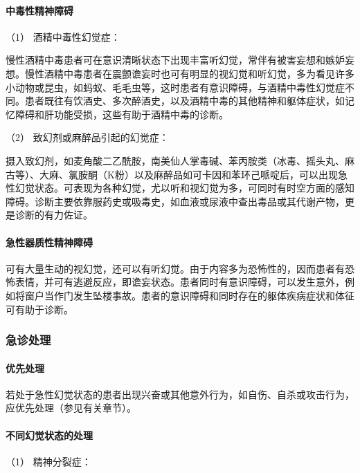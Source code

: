 \paragraph{中毒性精神障碍}

\hypertarget{text00048.htmlux5cux23CHP1-18-6-2-5-1}{}
（1） 酒精中毒性幻觉症：

慢性酒精中毒患者可在意识清晰状态下出现丰富听幻觉，常伴有被害妄想和嫉妒妄想。慢性酒精中毒患者在震颤谵妄时也可有明显的视幻觉和听幻觉，多为看见许多小动物或昆虫，如蚂蚁、毛毛虫等，这时患者有意识障碍，与酒精中毒性幻觉症不同。患者既往有饮酒史、多次醉酒史，以及酒精中毒的其他精神和躯体症状，如记忆障碍和肝功能受损，这些有助于酒精中毒的诊断。

\hypertarget{text00048.htmlux5cux23CHP1-18-6-2-5-2}{}
（2） 致幻剂或麻醉品引起的幻觉症：

摄入致幻剂，如麦角酸二乙酰胺，南美仙人掌毒碱、苯丙胺类（冰毒、摇头丸、麻古等）、大麻、氯胺酮（K粉）以及麻醉品如可卡因和苯环己哌啶后，可以出现急性幻觉状态。可表现为各种幻觉，尤以听和视幻觉为多，可同时有时空方面的感知障碍。诊断主要依靠服药史或吸毒史，如血液或尿液中查出毒品或其代谢产物，更是诊断的有力佐证。

\paragraph{急性器质性精神障碍}

可有大量生动的视幻觉，还可以有听幻觉。由于内容多为恐怖性的，因而患者有恐怖表情，并可有逃避反应，即谵妄状态。患者同时有意识障碍，可以发生意外，例如将窗户当作门发生坠楼事故。患者的意识障碍和同时存在的躯体疾病症状和体征可有助于诊断。

\subsubsection{急诊处理}

\paragraph{优先处理}

若处于急性幻觉状态的患者出现兴奋或其他意外行为，如自伤、自杀或攻击行为，应优先处理（参见有关章节）。

\paragraph{不同幻觉状态的处理}

\hypertarget{text00048.htmlux5cux23CHP1-18-6-3-2-1}{}
（1） 精神分裂症：


